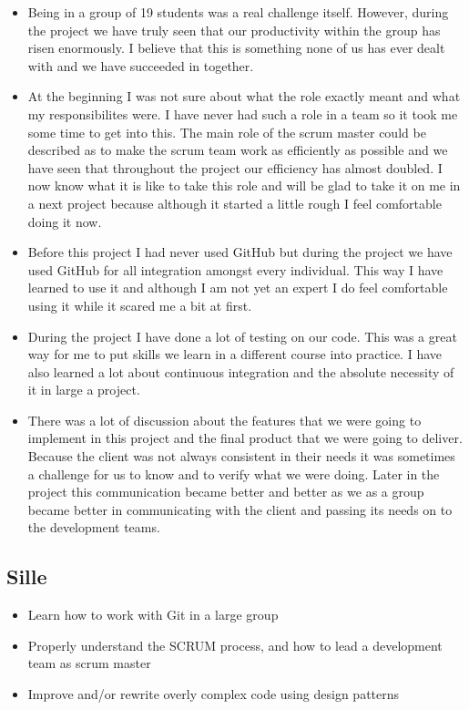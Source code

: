 \documentclass{article}
\begin{document}
\begin{enumerate}
\begin{itemize}
\begin{itemize}
	\item Being in a group of 19 students was a real challenge itself. However, during the project we have truly seen that our productivity within
		the group has risen enormously. I believe that this is something none of us has ever dealt with and we have succeeded in together.
	\item At the beginning I was not sure about what the role exactly meant and what my responsibilites were. I have never had such a role in a
		team so it took me some time to get into this. The main role of the scrum master could be described as to make the scrum team work as
		efficiently as possible and we have seen that throughout the project our efficiency has almost doubled. I now know what it is like to take this
		role and will be glad to take it on me in a next project because although it started a little rough I feel comfortable doing it now.
	\item Before this project I had never used GitHub but during the project we have used GitHub for all integration amongst every individual. This way
		I have learned to use it and although I am not yet an expert I do feel comfortable using it while it scared me a bit at first.
	\item During the project I have done a lot of testing on our code. This was a great way for me to put skills we learn in a different course into practice.
		I have also learned a lot about continuous integration and the absolute necessity of it in large a project.
	\item There was a lot of discussion about the features that we were going to implement in this project and the final product that we were going to deliver.
		Because the client was not always consistent in their needs it was sometimes a challenge for us to know and to verify what we were doing.
		Later in the project this communication became better and better as we as a group became better in communicating with the client and passing its needs on to the development teams.
\end{itemize}

\subsection*{Sille}
\begin{itemize}
\item Learn how to work with Git in a large group

\item Properly understand the SCRUM process, and how to lead a development team as scrum master
\item Improve and/or rewrite overly complex code using design patterns
\end{itemize}


\end{itemize}
\end{enumerate}
\end{document}
